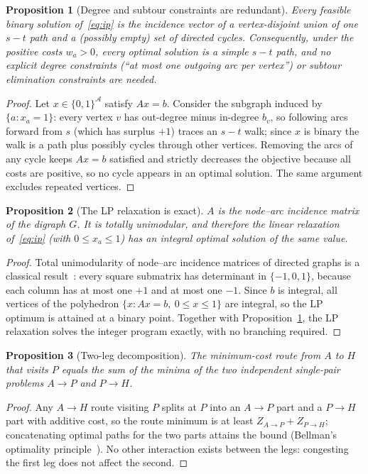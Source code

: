 \documentclass[10pt,twocolumn]{article}
\newtheorem{proposition}{Proposition}
\begin{document}
\begin{proposition}[Degree and subtour constraints are redundant]
\label{prop:degree}
Every feasible binary solution of~\eqref{eq:ip} is the incidence vector of a vertex-disjoint
union of one $s\!-\!t$ path and a (possibly empty) set of directed cycles. Consequently,
under the positive costs $w_a>0$, every \emph{optimal} solution is a simple $s\!-\!t$ path,
and no explicit degree constraints (``at most one outgoing arc per vertex'') or subtour
elimination constraints are needed.
\end{proposition}
\begin{proof}
Let $x\in\{0,1\}^{\mathcal{A}}$ satisfy $Ax=b$. Consider the subgraph induced by
$\{a : x_a=1\}$: every vertex $v$ has out-degree minus in-degree $b_v$, so following arcs
forward from $s$ (which has surplus $+1$) traces an $s\!-\!t$ walk; since $x$ is binary the
walk is a path plus possibly cycles through other vertices. Removing the arcs of any cycle
keeps $Ax=b$ satisfied and strictly decreases the objective because all costs are positive,
so no cycle appears in an optimal solution. The same argument excludes repeated vertices.
\end{proof}

\begin{proposition}[The LP relaxation is exact]
\label{prop:tu}
$A$ is the node--arc incidence matrix of the digraph $G$. It is totally unimodular, and
therefore the linear relaxation of~\eqref{eq:ip} (with $0\le x_a\le 1$) has an integral
optimal solution of the same value.
\end{proposition}
\begin{proof}
Total unimodularity of node--arc incidence matrices of directed graphs is a classical
result~\cite{fordfulkerson62,ahuja93,schrijver03}: every square submatrix has determinant in
$\{-1,0,1\}$, because each column has at most one $+1$ and at most one $-1$. Since $b$ is
integral, all vertices of the polyhedron $\{x : Ax=b,\ 0\le x\le 1\}$ are integral, so the
LP optimum is attained at a binary point. Together with
Proposition~\ref{prop:degree}, the LP relaxation solves the integer program exactly, with no
branching required.
\end{proof}

\begin{proposition}[Two-leg decomposition]
\label{prop:twoleg}
The minimum-cost route from $A$ to $H$ that visits $P$ equals the sum of the minima of the
two independent single-pair problems $A\to P$ and $P\to H$.
\end{proposition}
\begin{proof}
Any $A\to H$ route visiting $P$ splits at $P$ into an $A\to P$ part and a $P\to H$ part with
additive cost, so the route minimum is at least $Z_{A\to P}+Z_{P\to H}$; concatenating
optimal paths for the two parts attains the bound (Bellman's optimality
principle~\cite{bellman58}). No other interaction exists between the legs: congesting the
first leg does not affect the second.
\end{proof}
\end{document}
